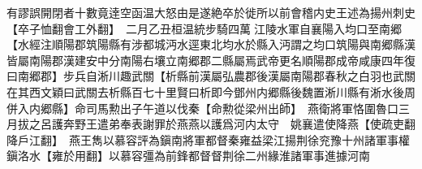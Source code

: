 有謬誤開閉者十數竟逹空函温大怒由是遂絶卒於徙所以前會稽内史王述為揚州刺史【卒子恤翻會工外翻】　二月乙丑桓温統步騎四萬江陵水軍自襄陽入均口至南郷【水經注順陽郡筑陽縣有涉都城沔水逕東北均水於縣入沔謂之均口筑陽與南郷縣漢皆屬南陽郡漢建安中分南陽右壤立南郷郡二縣屬焉武帝更名順陽郡成帝咸康四年復曰南郷郡】步兵自淅川趣武關【析縣前漢屬弘農郡後漢屬南陽郡春秋之白羽也武關在其西文穎曰武關去析縣百七十里賢曰析即今鄧州内郷縣後魏置淅川縣有淅水後周併入内郷縣】命司馬勲出子午道以伐秦【命勲從梁州出師】　燕衛將軍恪圍魯口三月拔之呂護奔野王遣弟奉表謝罪於燕燕以護爲河内太守　姚襄遣使降燕【使疏吏翻降戶江翻】　燕王雋以慕容評為鎭南將軍都督秦雍益梁江揚荆徐兖豫十州諸軍事權鎭洛水【雍於用翻】以慕容彊為前鋒都督督荆徐二州緣淮諸軍事進據河南